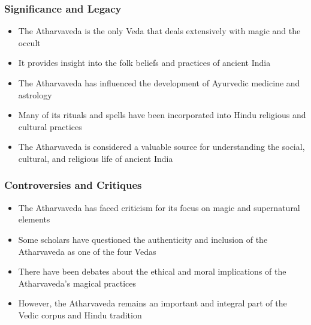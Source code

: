 \begin{frame}[fragile]\frametitle{Significance and Legacy}
    \begin{itemize}
        \item The Atharvaveda is the only Veda that deals extensively with magic and the occult
        \item It provides insight into the folk beliefs and practices of ancient India
        \item The Atharvaveda has influenced the development of Ayurvedic medicine and astrology
        \item Many of its rituals and spells have been incorporated into Hindu religious and cultural practices
        \item The Atharvaveda is considered a valuable source for understanding the social, cultural, and religious life of ancient India
    \end{itemize}
\end{frame}

\begin{frame}[fragile]\frametitle{Controversies and Critiques}
    \begin{itemize}
        \item The Atharvaveda has faced criticism for its focus on magic and supernatural elements
        \item Some scholars have questioned the authenticity and inclusion of the Atharvaveda as one of the four Vedas
        \item There have been debates about the ethical and moral implications of the Atharvaveda's magical practices
        \item However, the Atharvaveda remains an important and integral part of the Vedic corpus and Hindu tradition
    \end{itemize}
\end{frame}

